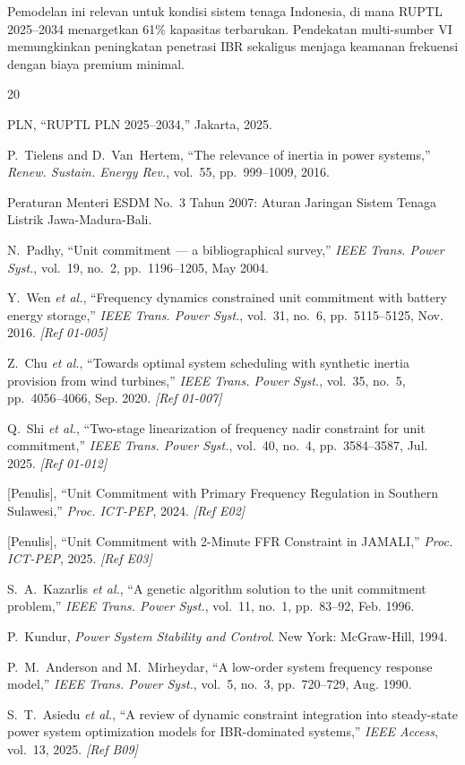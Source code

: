 \documentclass[journal]{IEEEtran}
\begin{document}
Pemodelan ini relevan untuk kondisi sistem tenaga Indonesia,
di mana RUPTL 2025--2034 menargetkan 61\% kapasitas
terbarukan. Pendekatan multi-sumber VI memungkinkan
peningkatan penetrasi IBR sekaligus menjaga keamanan
frekuensi dengan biaya premium minimal.


\begin{thebibliography}{20}

PLN, ``RUPTL PLN 2025--2034,'' Jakarta, 2025.

P.~Tielens and D.~Van~Hertem,
``The relevance of inertia in power systems,''
\textit{Renew. Sustain. Energy Rev.}, vol.~55,
pp.~999--1009, 2016.

Peraturan Menteri ESDM No.~3 Tahun 2007:
Aturan Jaringan Sistem Tenaga Listrik Jawa-Madura-Bali.

N.~Padhy, ``Unit commitment --- a bibliographical survey,''
\textit{IEEE Trans. Power Syst.}, vol.~19, no.~2,
pp.~1196--1205, May 2004.

Y.~Wen \textit{et al.},
``Frequency dynamics constrained unit commitment with battery
energy storage,''
\textit{IEEE Trans. Power Syst.}, vol.~31, no.~6,
pp.~5115--5125, Nov. 2016. \textit{[Ref 01-005]}

Z.~Chu \textit{et al.},
``Towards optimal system scheduling with synthetic inertia
provision from wind turbines,''
\textit{IEEE Trans. Power Syst.}, vol.~35, no.~5,
pp.~4056--4066, Sep. 2020. \textit{[Ref 01-007]}

Q.~Shi \textit{et al.},
``Two-stage linearization of frequency nadir constraint
for unit commitment,''
\textit{IEEE Trans. Power Syst.}, vol.~40, no.~4,
pp.~3584--3587, Jul. 2025. \textit{[Ref 01-012]}

[Penulis], ``Unit Commitment with Primary Frequency
Regulation in Southern Sulawesi,''
\textit{Proc. ICT-PEP}, 2024. \textit{[Ref E02]}

[Penulis], ``Unit Commitment with 2-Minute FFR Constraint
in JAMALI,''
\textit{Proc. ICT-PEP}, 2025. \textit{[Ref E03]}

S.~A.~Kazarlis \textit{et al.},
``A genetic algorithm solution to the unit commitment problem,''
\textit{IEEE Trans. Power Syst.}, vol.~11, no.~1,
pp.~83--92, Feb. 1996.

P.~Kundur, \textit{Power System Stability and Control}.
New York: McGraw-Hill, 1994.

P.~M.~Anderson and M.~Mirheydar,
``A low-order system frequency response model,''
\textit{IEEE Trans. Power Syst.}, vol.~5, no.~3,
pp.~720--729, Aug. 1990.

S.~T.~Asiedu \textit{et al.},
``A review of dynamic constraint integration into
steady-state power system optimization models for
IBR-dominated systems,''
\textit{IEEE Access}, vol.~13, 2025. \textit{[Ref B09]}

\end{thebibliography}
\end{document}
